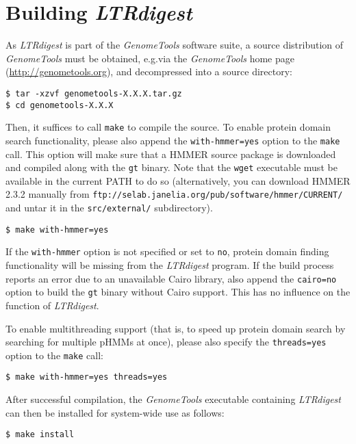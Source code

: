 \documentclass[12pt,titlepage]{article}
\newcommand{\LTRdigest}{\textit{LTRdigest}\xspace}
\newcommand{\GenomeTools}{\textit{GenomeTools}\xspace}
\newcommand{\Gt}{\texttt{gt}\xspace}
\begin{document}
\section{Building \emph{LTRdigest}} \label{Building}

As \LTRdigest is part of the \GenomeTools software suite, a source distribution
of \GenomeTools must be obtained, e.g.\@ via the \GenomeTools home page
(\url{http://genometools.org}), and decompressed into a source directory:

\begin{verbatim}
$ tar -xzvf genometools-X.X.X.tar.gz
$ cd genometools-X.X.X
\end{verbatim}

Then, it suffices to call \texttt{make} to compile the source. To enable protein
domain search functionality, please also append the \texttt{with-hmmer=yes}
option to the \texttt{make} call. This option will make sure that a HMMER source
package is downloaded and compiled along with the \Gt binary. Note that the
\texttt{wget} executable must be available in the current PATH to do so
(alternatively, you can download HMMER 2.3.2 manually from
\texttt{ftp://selab.janelia.org/pub/software/hmmer/CURRENT/} and untar it in the
\texttt{src/external/} subdirectory).

\begin{verbatim}
$ make with-hmmer=yes
\end{verbatim}%

If the \texttt{with-hmmer} option is not specified or set to \texttt{no},
protein domain finding functionality will be missing from the \LTRdigest
program. If the build process reports an error due to an unavailable Cairo
library, also append the \texttt{cairo=no} option to build the \Gt binary
without Cairo support. This has no influence on the function of \LTRdigest .

To enable multithreading support (that is, to speed up protein domain search by
searching for multiple pHMMs at once), please also specify the
\texttt{threads=yes} option to the \texttt{make} call:

\begin{verbatim}
$ make with-hmmer=yes threads=yes
\end{verbatim}%

After successful compilation, the \GenomeTools executable containing \LTRdigest
can then be installed for system-wide use as follows:

\begin{verbatim}
$ make install
\end{verbatim}%
\end{document}
